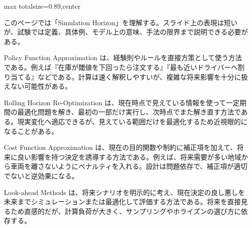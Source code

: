 \begin{minipage}[t]{0.58\textwidth}
\begin{adjustbox}{max totalsize={\textwidth}{0.89\textheight},center}
\begin{minipage}{\textwidth}\scriptsize
{}このページでは「Simulation Horizon」を理解する。スライド上の表現は短いが、試験では定義、具体例、モデル上の意味、手法の限界まで説明できる必要がある。\par
Policy Function Approximation は、経験則やルールを直接方策として使う方法である。例えば『在庫が閾値を下回ったら注文する』『最も近いドライバーへ割り当てる』などである。計算は速く解釈しやすいが、複雑な将来影響を十分に扱えない可能性がある。\par
Rolling Horizon Re-Optimization は、現在時点で見えている情報を使って一定期間の最適化問題を解き、最初の一部だけ実行し、次時点でまた解き直す方法である。現実変化へ適応できるが、見えている範囲だけを最適化するため近視眼的になることがある。\par
Cost Function Approximation は、現在の目的関数や制約に補正項を加えて、将来に良い影響を持つ決定を誘導する方法である。例えば、将来需要が多い地域から車両を離さないようにペナルティを入れる。設計は問題依存で、補正項が適切でないと逆効果になる。\par
Look-ahead Methods は、将来シナリオを明示的に考え、現在決定の良し悪しを未来までシミュレーションまたは最適化して評価する方法である。将来を直接見るため直感的だが、計算負荷が大きく、サンプリングやホライズンの選び方に依存する。\par

\end{minipage}
\end{adjustbox}
\end{minipage}
